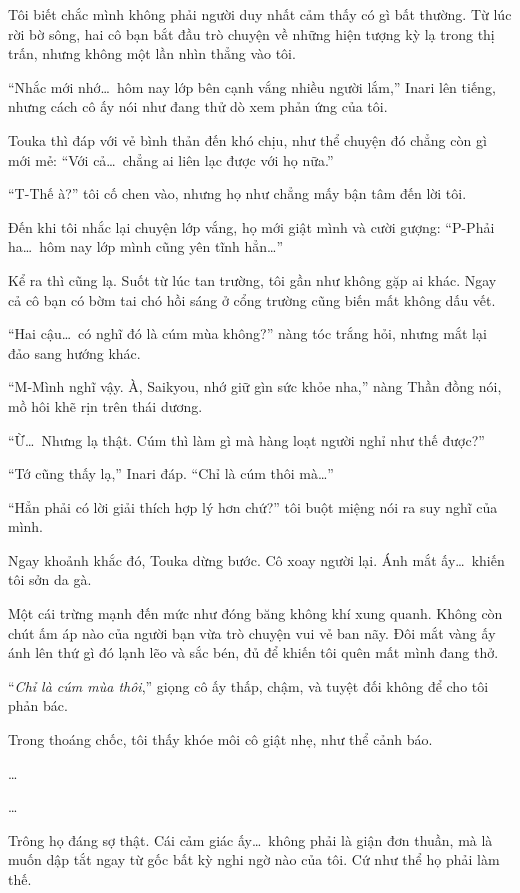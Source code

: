\documentclass[../main.tex]{subfiles}
\begin{document}
\ct

Tôi biết chắc mình không phải người duy nhất cảm thấy có gì bất thường. Từ lúc rời bờ sông, hai cô bạn bắt đầu trò chuyện về những hiện tượng kỳ lạ trong thị trấn, nhưng không một lần nhìn thẳng vào tôi.

``Nhắc mới nhớ\dots\ hôm nay lớp bên cạnh vắng nhiều người lắm,'' Inari lên tiếng, nhưng cách cô ấy nói như đang thử dò xem phản ứng của tôi.

Touka thì đáp với vẻ bình thản đến khó chịu, như thể chuyện đó chẳng còn gì mới mẻ:
``Với cả\dots\ chẳng ai liên lạc được với họ nữa.''

``T-Thế à?'' tôi cố chen vào, nhưng họ như chẳng mấy bận tâm đến lời tôi.

Đến khi tôi nhắc lại chuyện lớp vắng, họ mới giật mình và cười gượng: ``P-Phải ha\dots\ hôm nay lớp mình cũng yên tĩnh hẳn\dots''

Kể ra thì cũng lạ. Suốt từ lúc tan trường, tôi gần như không gặp ai khác. Ngay cả cô bạn có bờm tai chó hồi sáng ở cổng trường cũng biến mất không dấu vết.

``Hai cậu\dots\ có nghĩ đó là cúm mùa không?'' nàng tóc trắng hỏi, nhưng mắt lại đảo sang hướng khác.

``M-Mình nghĩ vậy. À, Saikyou, nhớ giữ gìn sức khỏe nha,'' nàng Thần đồng nói, mồ hôi khẽ rịn trên thái dương.

``Ừ\dots\ Nhưng lạ thật. Cúm thì làm gì mà hàng loạt người nghỉ như thế được?''

``Tớ cũng thấy lạ,'' Inari đáp. ``Chỉ là cúm thôi mà\dots''

``Hẳn phải có lời giải thích hợp lý hơn chứ?'' tôi buột miệng nói ra suy nghĩ của mình.

Ngay khoảnh khắc đó, Touka dừng bước. Cô xoay người lại. Ánh mắt ấy\dots\ khiến tôi sởn da gà.


Một cái trừng mạnh đến mức như đóng băng không khí xung quanh. Không còn chút ấm áp nào của người bạn vừa trò chuyện vui vẻ ban nãy. Đôi mắt vàng ấy ánh lên thứ gì đó lạnh lẽo và sắc bén, đủ để khiến tôi quên mất mình đang thở.

``\emph{Chỉ là cúm mùa thôi},'' giọng cô ấy thấp, chậm, và tuyệt đối không để cho tôi phản bác.

Trong thoáng chốc, tôi thấy khóe môi cô giật nhẹ, như thể cảnh báo.

\dots

\dots

Trông họ đáng sợ thật. Cái cảm giác ấy\dots\ không phải là giận đơn thuần, mà là muốn dập tắt ngay từ gốc bất kỳ nghi ngờ nào của tôi. Cứ như thể họ phải làm thế.
\end{document}
